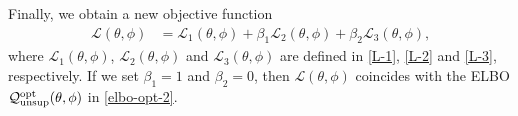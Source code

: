 
Finally, we obtain a new objective function 
\begin{align}
\label{eq:beta_elbo_xent}
    \mathcal{L}(\theta,\phi)
    &= \mathcal{L}_1(\theta,\phi) + \beta_1 \mathcal{L}_2(\theta,\phi) + \beta_2 \mathcal{L}_3(\theta,\phi) \text{,}
    \end{align}
where  
$\mathcal{L}_1(\theta,\phi)$, $\mathcal{L}_2(\theta,\phi)$ and
$\mathcal{L}_3(\theta,\phi)$
are defined in \eqref{L-1}, \eqref{L-2}
and \eqref{L-3}, respectively.
If we set $\beta_1=1$ and $\beta_2=0$, then
$\mathcal{L}(\theta,\phi)$ coincides with
the ELBO $\mathcal{Q}_{\mathrm{unsup}}^{\rm opt}(\theta,\phi)$ in \eqref{elbo-opt-2}.

